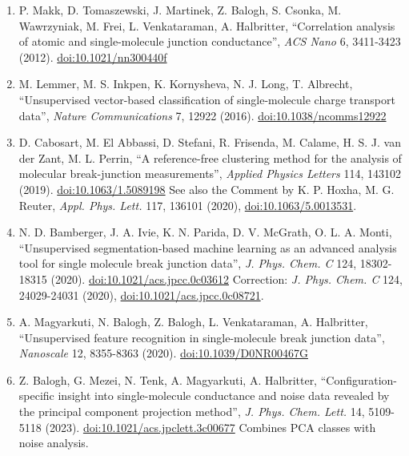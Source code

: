 \documentclass[
  11pt,
  a4paper,
]{article}
\providecommand{\tightlist}{%
  \setlength{\itemsep}{0pt}\setlength{\parskip}{0pt}}
\begin{document}
\begin{enumerate}
\def\labelenumi{\arabic{enumi}.}
\setcounter{enumi}{10}
\tightlist
\item
  P. Makk, D. Tomaszewski, J. Martinek, Z. Balogh, S. Csonka, M.
  Wawrzyniak, M. Frei, L. Venkataraman, A. Halbritter, ``Correlation
  analysis of atomic and single-molecule junction conductance'',
  \emph{ACS Nano} 6, 3411-3423 (2012).
  \href{https://doi.org/10.1021/nn300440f}{doi:10.1021/nn300440f}
\item
  M. Lemmer, M. S. Inkpen, K. Kornysheva, N. J. Long, T. Albrecht,
  ``Unsupervised vector-based classification of single-molecule charge
  transport data'', \emph{Nature Communications} 7, 12922 (2016).
  \href{https://doi.org/10.1038/ncomms12922}{doi:10.1038/ncomms12922}
\item
  D. Cabosart, M. El Abbassi, D. Stefani, R. Frisenda, M. Calame, H. S.
  J. van der Zant, M. L. Perrin, ``A reference-free clustering method
  for the analysis of molecular break-junction measurements'',
  \emph{Applied Physics Letters} 114, 143102 (2019).
  \href{https://doi.org/10.1063/1.5089198}{doi:10.1063/1.5089198} See
  also the Comment by K. P. Hoxha, M. G. Reuter, \emph{Appl. Phys.
  Lett.} 117, 136101 (2020),
  \href{https://doi.org/10.1063/5.0013531}{doi:10.1063/5.0013531}.
\item
  N. D. Bamberger, J. A. Ivie, K. N. Parida, D. V. McGrath, O. L. A.
  Monti, ``Unsupervised segmentation-based machine learning as an
  advanced analysis tool for single molecule break junction data'',
  \emph{J. Phys. Chem. C} 124, 18302-18315 (2020).
  \href{https://doi.org/10.1021/acs.jpcc.0c03612}{doi:10.1021/acs.jpcc.0c03612}
  Correction: \emph{J. Phys. Chem. C} 124, 24029-24031 (2020),
  \href{https://doi.org/10.1021/acs.jpcc.0c08721}{doi:10.1021/acs.jpcc.0c08721}.
\item
  A. Magyarkuti, N. Balogh, Z. Balogh, L. Venkataraman, A. Halbritter,
  ``Unsupervised feature recognition in single-molecule break junction
  data'', \emph{Nanoscale} 12, 8355-8363 (2020).
  \href{https://doi.org/10.1039/D0NR00467G}{doi:10.1039/D0NR00467G}
\item
  Z. Balogh, G. Mezei, N. Tenk, A. Magyarkuti, A. Halbritter,
  ``Configuration-specific insight into single-molecule conductance and
  noise data revealed by the principal component projection method'',
  \emph{J. Phys. Chem. Lett.} 14, 5109-5118 (2023).
  \href{https://doi.org/10.1021/acs.jpclett.3c00677}{doi:10.1021/acs.jpclett.3c00677}
  Combines PCA classes with noise analysis.
\end{enumerate}
\end{document}
